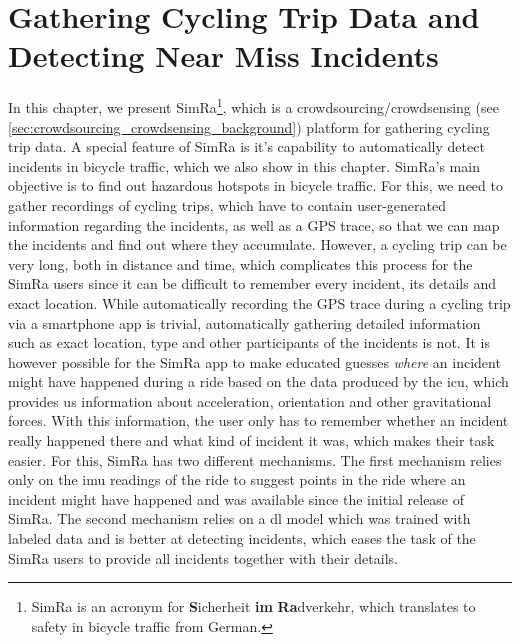 \chapter{Gathering Cycling Trip Data and Detecting Near Miss Incidents}
\label{cha:cyclesense}
In this chapter, we present SimRa\footnote{SimRa is an acronym for \textbf{S}icherheit \textbf{im} \textbf{Ra}dverkehr, which translates to safety in bicycle traffic from German.}, which is a crowdsourcing/crowdsensing (see \cref{sec:crowdsourcing_crowdsensing_background}) platform for gathering cycling trip data.
A special feature of SimRa is it's capability to automatically detect incidents in bicycle traffic, which we also show in this chapter.
SimRa's main objective is to find out hazardous hotspots in bicycle traffic.
For this, we need to gather recordings of cycling trips, which have to contain user-generated information regarding the incidents, as well as a GPS trace, so that we can map the incidents and find out where they accumulate.
However, a cycling trip can be very long, both in distance and time, which complicates this process for the SimRa users since it can be difficult to remember every incident, its details and exact location.
While automatically recording the GPS trace during a cycling trip via a smartphone app is trivial, automatically gathering detailed information such as exact location, type and other participants of the incidents is not.
It is however possible for the SimRa app to make educated guesses \textit{where} an incident might have happened during a ride based on the data produced by the \ac{icu}, which provides us information about acceleration, orientation and other gravitational forces.
With this information, the user only has to remember whether an incident really happened there and what kind of incident it was, which makes their task easier.
For this, SimRa has two different mechanisms.
The first mechanism relies only on the \ac{imu} readings of the ride to suggest points in the ride where an incident might have happened and was available since the initial release of SimRa.
The second mechanism relies on a \ac{dl} model which was trained with labeled data and is better at detecting incidents, which eases the task of the SimRa users to provide all incidents together with their details.

